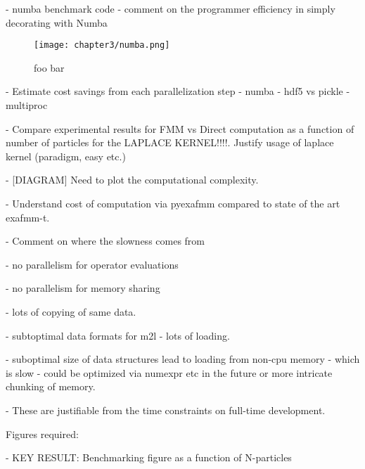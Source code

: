 - numba benchmark code
    - comment on the programmer efficiency in simply decorating with Numba


\begin{figure}[!h]
    \centering
    {\texttt{[image: chapter3/numba.png]}}

    \caption{foo bar}
    \label{fig:3_1_numba}
\end{figure}

- Estimate cost savings from each parallelization step
- numba
- hdf5 vs pickle
- multiproc

- Compare experimental results for FMM vs Direct computation as a function of number of particles for the LAPLACE KERNEL!!!!. Justify usage of laplace kernel (paradigm, easy etc.)

- [DIAGRAM] Need to plot the computational complexity.

- Understand cost of computation via pyexafmm compared to state of the art exafmm-t.

- Comment on where the slowness comes from

- no parallelism for operator evaluations

- no parallelism for memory sharing

- lots of copying of same data.

- subtoptimal data formats for m2l - lots of loading.

- suboptimal size of data structures lead to loading from non-cpu memory - which is slow - could be optimized via numexpr etc in the future or more intricate chunking of memory.

- These are justifiable from the time constraints on full-time development.

Figures required:

- KEY RESULT: Benchmarking figure as a function of N-particles
